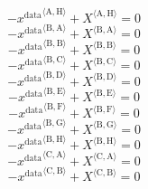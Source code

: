 \begin{equation}
-{x^{\mathrm{data}}}^{\langle \mathrm{\mathrm{A}},\mathrm{\mathrm{H}}\rangle} + {X}^{\langle \mathrm{A},\mathrm{H}\rangle} = 0
\end{equation}
\begin{equation}
-{x^{\mathrm{data}}}^{\langle \mathrm{\mathrm{B}},\mathrm{\mathrm{A}}\rangle} + {X}^{\langle \mathrm{B},\mathrm{A}\rangle} = 0
\end{equation}
\begin{equation}
-{x^{\mathrm{data}}}^{\langle \mathrm{\mathrm{B}},\mathrm{\mathrm{B}}\rangle} + {X}^{\langle \mathrm{B},\mathrm{B}\rangle} = 0
\end{equation}
\begin{equation}
-{x^{\mathrm{data}}}^{\langle \mathrm{\mathrm{B}},\mathrm{\mathrm{C}}\rangle} + {X}^{\langle \mathrm{B},\mathrm{C}\rangle} = 0
\end{equation}
\begin{equation}
-{x^{\mathrm{data}}}^{\langle \mathrm{\mathrm{B}},\mathrm{\mathrm{D}}\rangle} + {X}^{\langle \mathrm{B},\mathrm{D}\rangle} = 0
\end{equation}
\begin{equation}
-{x^{\mathrm{data}}}^{\langle \mathrm{\mathrm{B}},\mathrm{\mathrm{E}}\rangle} + {X}^{\langle \mathrm{B},\mathrm{E}\rangle} = 0
\end{equation}
\begin{equation}
-{x^{\mathrm{data}}}^{\langle \mathrm{\mathrm{B}},\mathrm{\mathrm{F}}\rangle} + {X}^{\langle \mathrm{B},\mathrm{F}\rangle} = 0
\end{equation}
\begin{equation}
-{x^{\mathrm{data}}}^{\langle \mathrm{\mathrm{B}},\mathrm{\mathrm{G}}\rangle} + {X}^{\langle \mathrm{B},\mathrm{G}\rangle} = 0
\end{equation}
\begin{equation}
-{x^{\mathrm{data}}}^{\langle \mathrm{\mathrm{B}},\mathrm{\mathrm{H}}\rangle} + {X}^{\langle \mathrm{B},\mathrm{H}\rangle} = 0
\end{equation}
\begin{equation}
-{x^{\mathrm{data}}}^{\langle \mathrm{\mathrm{C}},\mathrm{\mathrm{A}}\rangle} + {X}^{\langle \mathrm{C},\mathrm{A}\rangle} = 0
\end{equation}
\begin{equation}
-{x^{\mathrm{data}}}^{\langle \mathrm{\mathrm{C}},\mathrm{\mathrm{B}}\rangle} + {X}^{\langle \mathrm{C},\mathrm{B}\rangle} = 0
\end{equation}
